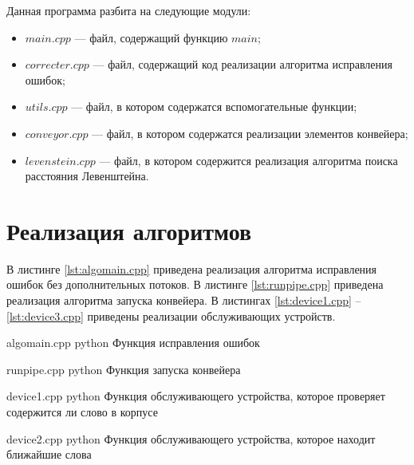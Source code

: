 Данная программа разбита на следующие модули:
\begin{itemize}
	\item $main.cpp$ --- файл, содержащий функцию $main$;
	\item $correcter.cpp$ --- файл, содержащий код реализации алгоритма исправления ошибок;
	\item $utils.cpp$ --- файл, в котором содержатся вспомогательные функции;
	\item $conveyor.cpp$ --- файл, в котором содержатся реализации элементов конвейера;
	\item $levenstein.cpp$ --- файл, в котором содержится реализация алгоритма поиска расстояния Левенштейна.
\end{itemize}

\section{Реализация алгоритмов}

В листинге \ref{lst:algomain.cpp} приведена реализация алгоритма исправления ошибок без дополнительных потоков. 
В листинге \ref{lst:runpipe.cpp} приведена реализация алгоритма запуска конвейера.
В листингах \ref{lst:device1.cpp} -- \ref{lst:device3.cpp} приведены реализации обслуживающих устройств.

\clearpage
{}
{algomain.cpp} %
{python} %
{Функция исправления ошибок} %

\clearpage

{runpipe.cpp} %
{python} %
{Функция запуска конвейера} %

\clearpage

{device1.cpp} %
{python} %
{Функция обслуживающего устройства, которое проверяет содержится ли слово в корпусе} %

\clearpage

{device2.cpp} %
{python} %
{Функция обслуживающего устройства, которое находит ближайшие слова} %

